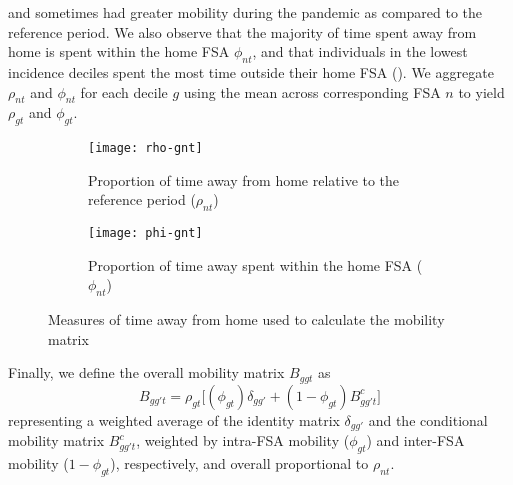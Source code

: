 and sometimes had greater mobility during the pandemic as compared to the reference period.
We also observe that the majority of time spent away from home
is spent within the home FSA $\phi_{nt}$,
and that individuals in the lowest incidence deciles
spent the most time outside their home FSA ().
We aggregate $\rho_{nt}$ and $\phi_{nt}$ for each decile $g$
using the mean across corresponding FSA $n$ to yield $\rho_{gt}$ and $\phi_{gt}$.
\begin{figure}
  \centering
  \begin{subfigure}[t]{0.45\linewidth}
    \texttt{[image: rho-gnt]}
    \caption{Proportion of time away from home relative to the reference period
      ($\rho_{nt}$)}
    \label{fig:rho-gt}
  \end{subfigure}\quad
  \begin{subfigure}[t]{0.45\linewidth}
    \texttt{[image: phi-gnt]}
    \caption{Proportion of time away spent within the home FSA
      ($\phi_{nt}$)}
    \label{fig:phi-gt}
  \end{subfigure}
  \caption{Measures of time away from home used to calculate the mobility matrix}
  \label{fig:t-away}
\end{figure}
\par
Finally, we define the overall mobility matrix $B_{ggt}$ as
\begin{equation}\label{eq:Bgg.t}
  B_{gg't} = \rho_{gt} \Big[
    (\phi_{gt}) \delta_{gg'} + (1-\phi_{gt}) B^c_{gg't}
  \Big]
\end{equation}
representing a weighted average of
the identity matrix $\delta_{gg'}$ and
the conditional mobility matrix $B^c_{gg't}$, weighted by
intra-FSA mobility ($\phi_{gt}$) and
inter-FSA mobility ($1 - \phi_{gt}$), respectively,
and overall proportional to $\rho_{nt}$.

